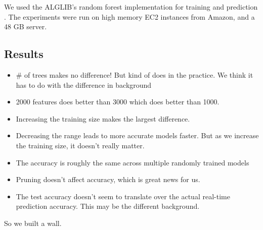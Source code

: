 We used the ALGLIB's random forest implementation for training and prediction \cite{alglib}. The experiments were run on high memory EC2 instances from Amazon, and a 48 GB server. 

\subsection{Results}
\begin{itemize}
	\item \# of trees makes no difference! But kind of does in the practice. We think it has to do with the difference in background
	\item 2000 features does better than 3000 which does better than 1000.
	\item Increasing the training size makes the largest difference.
	\item Decreasing the range leads to more accurate models faster. But as we increase the training size, it doesn't really matter.
	\item The accuracy is roughly the same across multiple randomly trained models
	\item Pruning doesn't affect accuracy, which is great news for us.
	\item The test accuracy doesn't seem to translate over the actual real-time prediction accuracy. This may be the different background.
\end{itemize}

So we built a wall.